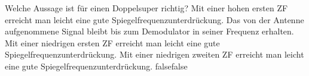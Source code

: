     {Welche Aussage ist für einen Doppelsuper richtig?}
    {Mit einer hohen ersten ZF erreicht man leicht eine gute Spiegelfrequenzunterdrückung.}
    {Das von der Antenne aufgenommene Signal bleibt bis zum Demodulator in seiner Frequenz erhalten.}
    {Mit einer niedrigen ersten ZF erreicht man leicht eine gute Spiegelfrequenzunterdrückung.}
    {Mit einer niedrigen zweiten ZF erreicht man leicht eine gute Spiegelfrequenzunterdrückung.}
    {false}{false}